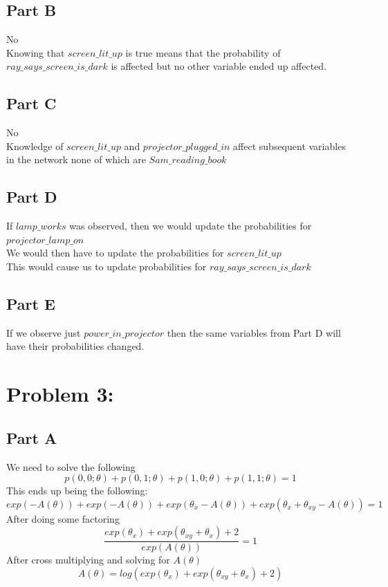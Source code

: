 \documentclass[twoside,11pt]{article}
\theoremstyle{definition}
\begin{document}
\subsection*{Part B}

No\\
Knowing that $\textit{screen\_lit\_up}$ is true means that the probability of $\textit{ray\_says\_screen\_is\_dark}$ is affected but no other variable ended up affected.

\subsection*{Part C}

No\\
Knowledge of $\textit{screen\_lit\_up}$ and $\textit{projector\_plugged\_in}$ affect subsequent variables in the network none of which are $\textit{Sam\_reading\_book}$

\subsection*{Part D}

If $\textit{lamp\_works}$ was observed, then we would update the probabilities for $\textit{projector\_lamp\_on}$\\
We would then have to update the probabilities for $\textit{screen\_lit\_up}$\\
This would cause us to update probabilities for $\textit{ray\_says\_screen\_is\_dark}$

\subsection*{Part E}

If we observe just $\textit{power\_in\_projector}$ then the same variables from Part D will have their probabilities changed.

\section*{Problem 3: }

\subsection*{Part A}

We need to solve the following
\[
p(0,0;\theta) + p(0,1;\theta) + p(1,0;\theta) + p(1,1;\theta) = 1
\]
This ends up being the following:
\[
exp(-A(\theta)) + exp(-A(\theta)) + exp(\theta_x - A(\theta)) + exp(\theta_x + \theta_{xy} - A(\theta)) = 1
\]
After doing some factoring
\[
\frac{exp(\theta_x) + exp(\theta_{xy} + \theta_x) + 2}{exp(A(\theta))} = 1
\]
After cross multiplying and solving for $A(\theta)$
\[
A(\theta) = log( exp(\theta_x) + exp(\theta_{xy} + \theta_x) + 2 )
\]
\end{document}
